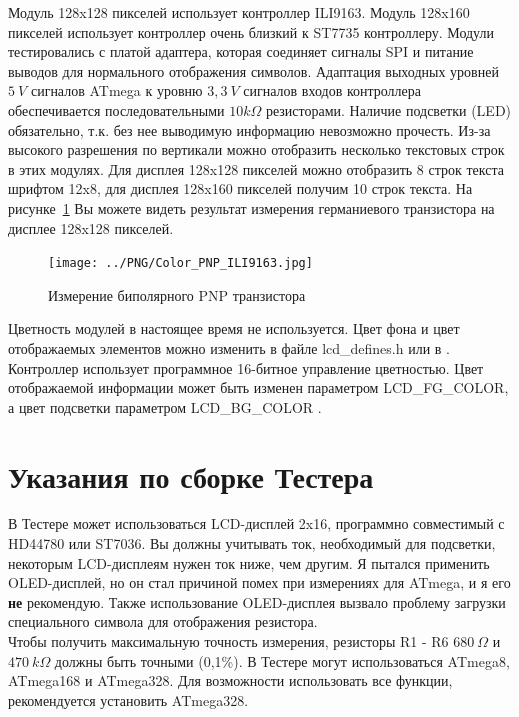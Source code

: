 Модуль 128x128 пикселей использует контроллер ILI9163.
Модуль 128x160 пикселей использует контроллер очень близкий к ST7735 контроллеру.
Модули тестировались с платой адаптера, которая соединяет сигналы SPI и питание выводов для 
нормального отображения символов. Адаптация выходных уровней \(5~V\) сигналов ATmega к уровню \(3,3~V\) 
сигналов входов контроллера обеспечивается последовательными \(10 k\Omega\) резисторами.
Наличие подсветки (LED) обязательно, т.к. без нее выводимую информацию невозможно прочесть.
Из-за высокого разрешения по вертикали можно отобразить несколько текстовых строк в этих модулях.
Для дисплея 128x128 пикселей можно отобразить 8 строк текста шрифтом 12x8,
для дисплея 128x160 пикселей получим 10 строк текста.
На рисунке~\ref{fig:Color_PNP} Вы можете видеть результат измерения германиевого транзистора
на дисплее 128x128 пикселей.

\begin{figure}[H]
\centering
\texttt{[image: ../PNG/Color\_PNP\_ILI9163.jpg]}
\caption{Измерение биполярного PNP транзистора}
\label{fig:Color_PNP}
\end{figure}

Цветность модулей в настоящее время не используется.
Цвет фона и цвет отображаемых элементов можно изменить в файле lcd\_defines.h или
в .
Контроллер использует программное 16-битное управление цветностью. Цвет отображаемой информации может 
быть изменен параметром LCD\_FG\_COLOR, а цвет подсветки параметром LCD\_BG\_COLOR .



\section{Указания по сборке Тестера }

В Тестере может использоваться LCD-дисплей 2x16, программно совместимый с HD44780 или ST7036. Вы должны учитывать ток, 
необходимый для подсветки, некоторым LCD-дисплеям нужен ток ниже, чем другим. Я пытался применить OLED-дисплей, но он 
стал причиной помех при измерениях для ATmega, и я его \textbf{ не} рекомендую. Также использование OLED-дисплея вызвало 
проблему загрузки специального символа для отображения резистора.\\

Чтобы получить максимальную точность измерения, резисторы R1 - R6 \(680~\Omega\) и
\(470~k\Omega\) должны быть точными (0,1\%). В Тестере могут использоваться ATmega8, ATmega168 и ATmega328. Для 
возможности использовать все функции, рекомендуется установить ATmega328.\\
 
